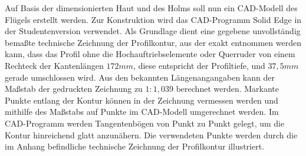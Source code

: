 Auf Basis der dimensionierten Haut und des Holms soll nun ein CAD-Modell des Flügels erstellt werden. Zur Konstruktion wird das CAD-Programm Solid Edge in der Studentenversion verwendet. Als Grundlage dient eine gegebene unvollständig bemaßte technische Zeichnung der Profilkontur, aus der exakt entnommen werden kann, dass das Profil ohne die Hochauftriebselemente oder Querruder von einem Rechteck der Kantenlängen $ 172mm $, diese entspricht der Profiltiefe, und $ 37,5mm $ gerade umschlossen wird. Aus den bekannten Längenangangaben kann der Maßstab der gedruckten Zeichnung zu $ 1:1,039 $ berechnet werden. Markante Punkte entlang der Kontur können in der Zeichnung vermessen werden und mithilfe des Maßstabs auf Punkte im CAD-Modell umgerechnet werden. Im CAD-Programm werden Tangentenbögen von Punkt zu Punkt gelegt, um die Kontur hinreichend glatt anzunähern. Die verwendeten Punkte werden durch die im Anhang befindliche technische Zeichnung der Profilkontur illustriert.\\

